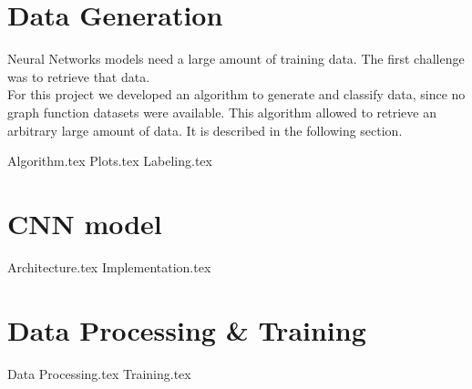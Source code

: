 \documentclass[11pt,a4paper]{scrartcl}
\begin{document}
	\section{Data Generation}
	Neural Networks models need a large amount of training data. The first challenge was to retrieve that data.\\
	For this project we developed an algorithm to generate and classify data, since no graph function datasets were available. This algorithm allowed to retrieve an arbitrary large amount of data. It is described in the following section.
	
	{Algorithm.tex}
	{Plots.tex}
	{Labeling.tex}


	\section{CNN model}
	{Architecture.tex}
	{Implementation.tex}
	
	\section{Data Processing \& Training}
	{Data Processing.tex}
	{Training.tex}
\end{document}

